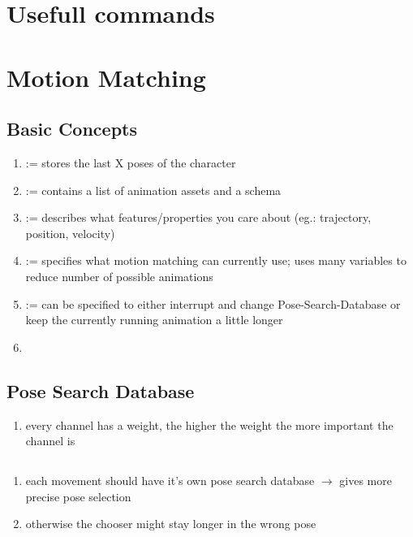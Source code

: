     \section{Usefull commands}


    \section{Motion Matching}

        \subsection{Basic Concepts}
            \begin{enumerate}
                \item {} := stores the last X poses of the character
                \item {} := contains a list of animation assets and a schema
                \item {} := describes what features/properties you care about (eg.: trajectory, position, velocity)
                \item {} := specifies what motion matching can currently use; uses many variables to reduce number of possible animations
                \item {} := can be specified to either interrupt and change Pose-Search-Database or keep the currently running animation a little longer
                \item 
            \end{enumerate}


        \subsection{Pose Search Database}
            \begin{enumerate}
                \item every channel has a weight, the higher the weight the more important the channel is
            \end{enumerate}
        


        \subsection{}
            \begin{enumerate}
                \item each movement should have it's own pose search database $\rightarrow$ gives more precise pose selection
                \item otherwise the chooser might stay longer in the wrong pose
            \end{enumerate}


